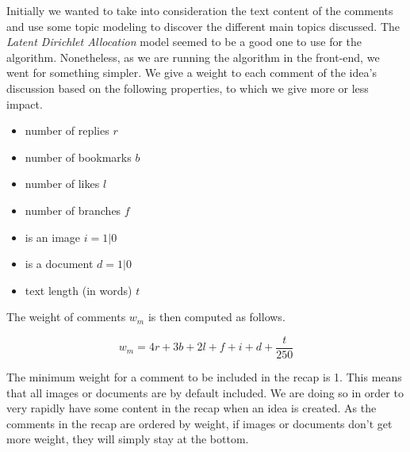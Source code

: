 \documentclass[a4paper,12pt, oneside]{article}
\begin{document}
Initially we wanted to take into consideration the text content of the comments and use some topic modeling to discover the different main topics discussed.
The \emph{Latent Dirichlet Allocation} \cite{blei2003latent} model seemed to be a good one to use for the algorithm.
Nonetheless, as we are running the algorithm in the front-end, we went for something simpler.
We give a weight to each comment of the idea's discussion based on the following properties, to which we give more or less impact.

\begin{multicols}{2}
    \begin{itemize}
        \item number of replies $r$
        \item number of bookmarks $b$
        \item number of likes $l$
        \item number of branches $f$
        \item is an image $i = 1 | 0$
        \item is a document $d = 1 | 0$
        \item text length (in words) $t$
    \end{itemize}
\end{multicols}

The weight of comments $w_m$ is then computed as follows.

\begin{equation}
    \label{eq.commentWeightInRecap}
    w_m = 4r + 3b + 2l + f + i + d + \frac{t}{250}
\end{equation}

The minimum weight for a comment to be included in the recap is 1.
This means that all images or documents are by default included.
We are doing so in order to very rapidly have some content in the recap when an idea is created.
As the comments in the recap are ordered by weight, if images or documents don't get more weight, they will simply stay at the bottom.
\end{document}
